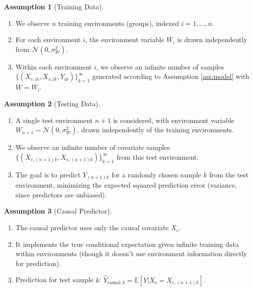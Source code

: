 \documentclass{article}
\theoremstyle{plain}
\theoremstyle{definition}
\newtheorem{assumption}{Assumption}[section]
\theoremstyle{remark}
\newcommand{\E}{\mathbb{E}}
\newcommand{\N}{\mathcal{N}} %
\begin{document}
\begin{assumption}[Training Data]\label{ass:train}
\begin{enumerate}
    \item We observe $n$ training environments (groups), indexed $i=1, \dots, n$.
    \item For each environment $i$, the environment variable $W_i$ is drawn independently from $\N(0, \sigma_W^2)$.
    \item Within each environment $i$, we observe an infinite number of samples $\{ (X_{c,ik}, X_{s,ik}, Y_{ik}) \}_{k=1}^\infty$ generated according to Assumption \ref{ass:model} with $W = W_i$.
\end{enumerate}
\end{assumption}

\begin{assumption}[Testing Data]\label{ass:test}
\begin{enumerate}
    \item A single test environment $n+1$ is considered, with environment variable $W_{n+1} \sim \N(0, \sigma_W^2)$, drawn independently of the training environments.
    \item We observe an infinite number of covariate samples $\{ (X_{c,(n+1)k}, X_{s,(n+1)k}) \}_{k=1}^\infty$ from this test environment.
    \item The goal is to predict $Y_{(n+1)k}$ for a randomly chosen sample $k$ from the test environment, minimizing the expected squared prediction error (variance, since predictors are unbiased).
\end{enumerate}
\end{assumption}

\begin{assumption}[Causal Predictor]\label{ass:causal}
\begin{enumerate}
    \item The causal predictor uses only the causal covariate $X_c$.
    \item It implements the true conditional expectation given infinite training data within environments (though it doesn't use environment information directly for prediction).
    \item Prediction for test sample $k$: $\hat{Y}_{\text{causal}, k} = \E[Y | X_c = X_{c,(n+1)k}]$.
\end{enumerate}
\end{assumption}
\end{document}
